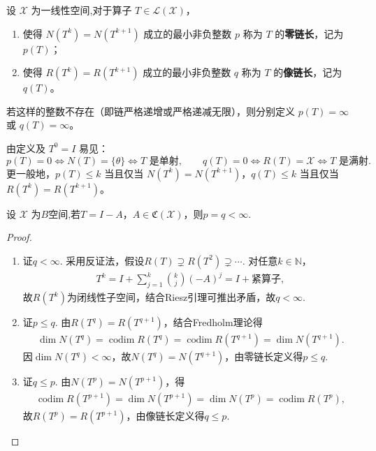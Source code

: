 \documentclass[../../main.tex]{subfiles}%
\begin{document}
\begin{definition}[零链长与像链长]
设 $\mathscr{X}$ 为一线性空间,对于算子 $T \in \mathscr{L}(\mathscr{X})$，
\begin{enumerate}[(1)]
\item 使得 $N(T^k) = N(T^{k+1})$ 成立的最小非负整数 $p$ 称为 $T$ 的\textbf{零链长}，记为 $p(T)$；
\item 使得 $R(T^k) = R(T^{k+1})$ 成立的最小非负整数 $q$ 称为 $T$ 的\textbf{像链长}，记为 $q(T)$。
\end{enumerate}
若这样的整数不存在（即链严格递增或严格递减无限），则分别定义 $p(T) = \infty$ 或 $q(T) = \infty$。
\end{definition}
\begin{remark}
由定义及 $T^0 = I$ 易见：
\[
p(T) = 0 \iff N(T) = \{\theta\} \iff T \text{ 是单射},\qquad
q(T) = 0 \iff R(T) = \mathscr{X} \iff T \text{ 是满射}.
\]
更一般地，$p(T) \leqslant k$ 当且仅当 $N(T^k) = N(T^{k+1})$，$q(T) \leqslant k$ 当且仅当 $R(T^k) = R(T^{k+1})$。
\end{remark}

\begin{lemma}
设 $\mathscr{X}$ 为$B$空间,若$T=I-A$，$A\in\mathfrak{C}(\mathscr{X})$，则$p=q<\infty$.
\end{lemma}
\begin{proof}
\begin{enumerate}[(1)]
\item 证$q<\infty$.
采用反证法，假设$R(T)\supsetneq R(T^2)\supsetneq\cdots$.
对任意$k\in\mathbb{N}$，
\begin{align*}
T^k=I+\sum\limits_{j=1}^k\binom{k}{j}(-A)^j=I+\text{紧算子},
\end{align*}
故$R(T^k)$为闭线性子空间，结合Riesz引理可推出矛盾，故$q<\infty$.

\item 证$p\leqslant q$.
由$R(T^q)=R(T^{q+1})$，结合Fredholm理论得
\begin{align*}
\dim N(T^q)=\operatorname{codim}R(T^q)=\operatorname{codim}R(T^{q+1})=\dim N(T^{q+1}).
\end{align*}
因$\dim N(T^q)<\infty$，故$N(T^q)=N(T^{q+1})$，由零链长定义得$p\leqslant q$.

\item 证$q\leqslant p$.
由$N(T^p)=N(T^{p+1})$，得
\begin{align*}
\operatorname{codim}R(T^{p+1})=\dim N(T^{p+1})=\dim N(T^p)=\operatorname{codim}R(T^p),
\end{align*}
故$R(T^p)=R(T^{p+1})$，由像链长定义得$q\leqslant p$.
\end{enumerate}
\end{proof}
\end{document}
